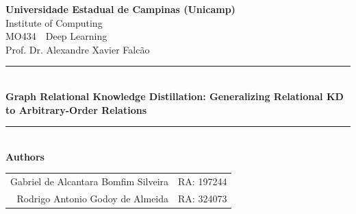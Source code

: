 \documentclass[11pt,letterpaper]{article}
\newcommand{\paperTitle}{Graph Relational Knowledge Distillation: Generalizing Relational KD to Arbitrary-Order Relations}
\newcommand{\authorOne}{Gabriel de Alcantara Bomfim Silveira}
\newcommand{\raOne}{RA: 197244}
\newcommand{\authorTwo}{Rodrigo Antonio Godoy de Almeida}
\newcommand{\raTwo}{RA: 324073}
\begin{document}

\begin{titlepage}
    \thispagestyle{empty}
    \centering

    {\large \textbf{Universidade Estadual de Campinas (Unicamp)}}\\[0.25cm]
    {\large Institute of Computing}\\[2.0cm]

    {\large MO434 \,\textendash\, Deep Learning}\\[0.25cm]
    {\large Prof. Dr. Alexandre Xavier Falc\~{a}o}\\[2.5cm]

    \rule{0.85\textwidth}{0.4pt}\\[0.6cm]
    {\LARGE \textbf{\paperTitle}}\\[0.6cm]
    \rule{0.85\textwidth}{0.4pt}\\[2.5cm]

    {\large \textbf{Authors}}\\[0.25cm]
    \begin{tabular}{rl}
        \large \authorOne{}  & \large \raOne  \\
        \large \authorTwo{} & \large \raTwo  \\
    \end{tabular}\\[2.5cm]


\end{titlepage}
\end{document}
